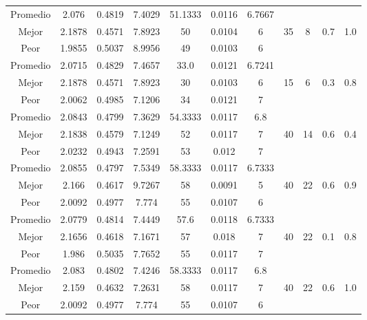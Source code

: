 \begin{table}[h!]
\begin{center}
\begin{tabular}{|c|c|c|c|c|c|c|c|c|c|c|}
        \hline
        \hline
            Promedio  & 2.076 & 0.4819 & 7.4029 & 51.1333 & 0.0116 & 6.7667 &  &  &  & \\
            \cline{1-7}
            Mejor & 2.1878 & 0.4571  & 7.8923 & 50 & 0.0104 & 6 & 35 & 8 & 0.7 & 1.0\\
            \cline{1-7}
            Peor & 1.9855 & 0.5037  & 8.9956 & 49 & 0.0103 & 6 &  &  &  & \\
        \hline
        \hline
            Promedio  & 2.0715 & 0.4829 & 7.4657 & 33.0 & 0.0121 & 6.7241 &  &  &  & \\
            \cline{1-7}
            Mejor & 2.1878 & 0.4571  & 7.8923 & 30 & 0.0103 & 6 & 15 & 6 & 0.3 & 0.8\\
            \cline{1-7}
            Peor & 2.0062 & 0.4985  & 7.1206 & 34 & 0.0121 & 7 &  &  &  & \\
        \hline
        \hline
            Promedio  & 2.0843 & 0.4799 & 7.3629 & 54.3333 & 0.0117 & 6.8 &  &  &  & \\
            \cline{1-7}
            Mejor & 2.1838 & 0.4579  & 7.1249 & 52 & 0.0117 & 7 & 40 & 14 & 0.6 & 0.4\\
            \cline{1-7}
            Peor & 2.0232 & 0.4943  & 7.2591 & 53 & 0.012 & 7 &  &  &  & \\
        \hline
        \hline
            Promedio  & 2.0855 & 0.4797 & 7.5349 & 58.3333 & 0.0117 & 6.7333 &  &  &  & \\
            \cline{1-7}
            Mejor & 2.166 & 0.4617  & 9.7267 & 58 & 0.0091 & 5 & 40 & 22 & 0.6 & 0.9\\
            \cline{1-7}
            Peor & 2.0092 & 0.4977  & 7.774 & 55 & 0.0107 & 6 &  &  &  & \\
        \hline
        \hline
            Promedio  & 2.0779 & 0.4814 & 7.4449 & 57.6 & 0.0118 & 6.7333 &  &  &  & \\
            \cline{1-7}
            Mejor & 2.1656 & 0.4618  & 7.1671 & 57 & 0.018 & 7 & 40 & 22 & 0.1 & 0.8\\
            \cline{1-7}
            Peor & 1.986 & 0.5035  & 7.7652 & 55 & 0.0117 & 7 &  &  &  & \\
        \hline
        \hline
            Promedio  & 2.083 & 0.4802 & 7.4246 & 58.3333 & 0.0117 & 6.8 &  &  &  & \\
            \cline{1-7}
            Mejor & 2.159 & 0.4632  & 7.2631 & 58 & 0.0117 & 7 & 40 & 22 & 0.6 & 1.0\\
            \cline{1-7}
            Peor & 2.0092 & 0.4977  & 7.774 & 55 & 0.0107 & 6 &  &  &  & \\

\end{tabular}
\end{center}
\end{table}
